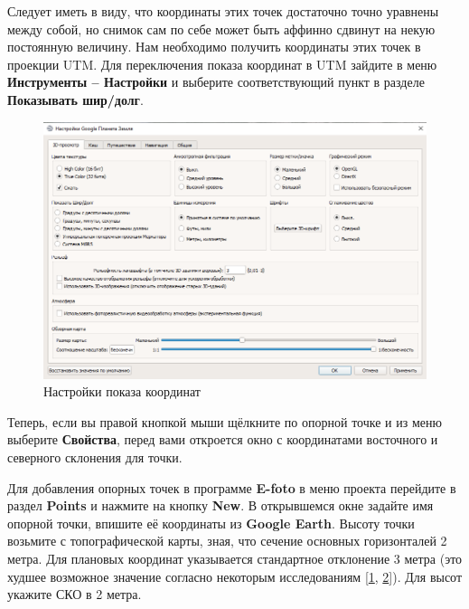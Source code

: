 \documentclass[
  12pt,
]{book}
\begin{document}
Следует иметь в виду, что координаты этих точек достаточно точно уравнены между собой, но снимок сам по себе может быть аффинно сдвинут на некую постоянную величину. Нам необходимо получить координаты этих точек в проекции UTM. Для переключения показа координат в UTM зайдите в меню \textbf{Инструменты -- Настройки} и выберите соответствующий пункт в разделе \textbf{Показывать шир/долг}.

\begin{figure}
\centering
\includegraphics{images/Ref13/GE_Settings.png}
\caption{Настройки показа координат}
\end{figure}

Теперь, если вы правой кнопкой мыши щёлкните по опорной точке и из меню выберите \textbf{Свойства}, перед вами откроется окно с координатами восточного и северного склонения для точки.

Для добавления опорных точек в программе \textbf{E-foto} в меню проекта перейдите в раздел \textbf{Points} и нажмите на кнопку \textbf{New}. В открывшемся окне задайте имя опорной точки, впишите её координаты из \textbf{Google Earth}. Высоту точки возьмите с топографической карты, зная, что сечение основных горизонталей 2 метра. Для плановых координат указывается стандартное отклонение 3 метра (это худшее возможное значение согласно некоторым исследованиям {[}\href{https://www.researchgate.net/publication/332438341_Positional_Accuracy_Testing_of_Google_Earth}{1}, \href{https://www.tandfonline.com/doi/abs/10.3846/20296991.2017.1330767}{2}{]}). Для высот укажите СКО в 2 метра.
\end{document}
